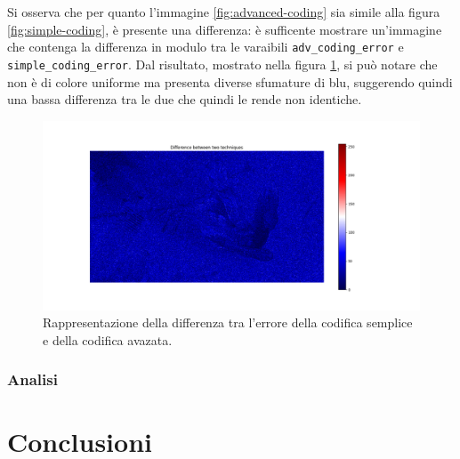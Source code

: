 \FloatBarrier\noindent Si osserva che per quanto l'immagine \ref{fig:advanced-coding} sia simile alla figura \ref{fig:simple-coding}, è presente una differenza: è sufficente mostrare un'immagine che contenga la differenza in modulo tra le varaibili \texttt{adv\_coding\_error} e \texttt{simple\_coding\_error}. Dal risultato, mostrato nella figura \ref{fig:error-difference}, si può notare che non è di colore uniforme ma presenta diverse sfumature di blu, suggerendo quindi una bassa differenza tra le due che quindi le rende non identiche.

\begin{figure}[h]
    \centering
    \includegraphics[width = .9\textwidth]{hw-1/report/imgs/error-difference.png}
    \caption{Rappresentazione della differenza tra l'errore della codifica semplice e della codifica avazata.}
    \label{fig:error-difference}
\end{figure}



\subsubsection{Analisi}





\vspace{30px}\section{Conclusioni}

